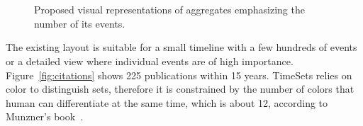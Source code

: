 \begin{figure}[!htb]
	\centering
	\\
	\hfill
	\\
	\hfill
	\caption{Proposed visual representations of aggregates emphasizing the number of its events.}
	\label{fig:aggreate}
\end{figure}

The existing layout is suitable for a small timeline with a few hundreds of events or a detailed view where individual events are of high importance. Figure~\ref{fig:citations} shows 225 publications within 15 years. TimeSets relies on color to distinguish sets, therefore it is constrained by the number of colors that human can differentiate at the same time, which is about 12, according to Munzner's book~\cite{Munzner2014}.